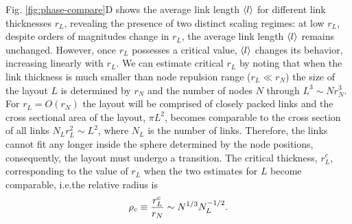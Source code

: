 \documentclass[nofootinbib,preprint,floatfix,titlepage,endfloats]{revtex4} %
\begin{document}
Fig. \ref{fig:phase-compare}D shows the average link length $\left<l\right>$ 
for different link thicknesses $r_L$, revealing the presence of two distinct scaling regimes: at low $r_L$, despite orders of magnitudes change in $r_L$, the average link length $\left<l\right>$ remains unchanged. However, once $r_L$ possesses a critical value, $\left<l\right>$ changes its behavior, increasing linearly with $r_L$. We can estimate critical $r_L$ by noting that when 
 the link thickness is much smaller than node repulsion range ($r_L\ll r_N$) the size of the layout $L$ is determined by $r_N$ and the number of nodes $N$ through
$ L^3 \sim Nr_N^3 $. %
For $r_L = O(r_N)$ %
the layout will be comprised of closely packed links and the cross sectional area of the layout, $\pi L^2$, becomes comparable to the cross section of all links $ N_L r_L^2 \sim L^2$, where $N_L$ is the number of links. %
Therefore, the links cannot fit any longer inside the sphere determined by the node positions, consequently, the layout must undergo a transition. The critical thickness, $r^c_L$, corresponding to the value of $r_L$ when the two estimates for $L$ become comparable, i.e.the relative radius is 
\begin{equation}
    \rho_c \equiv {r^c_L\over r_N} \sim N^{1/3} N_L^{-1/2}. \label{eq:trans}
\end{equation}
\end{document}
